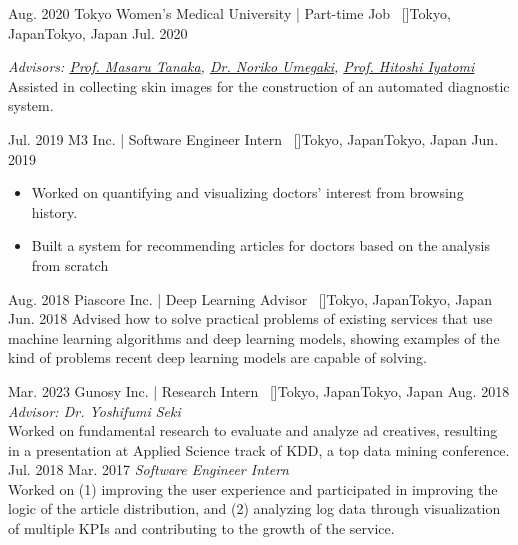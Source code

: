 \begin{experiences}
    \emptySeparator
    \researchexperience
    {Aug. 2020}   {Tokyo Women's Medical University | Part-time Job{\normalfont  ~ [\href{https://www.twmu.ac.jp/english/}{\small{\websiteSymbol}}]}}{Tokyo, Japan}{Tokyo, Japan}
    {Jul. 2020} {
    \textit{Advisors: \href{https://www.researchgate.net/scientific-contributions/Masaru-Tanaka-2078765174}{Prof. Masaru Tanaka}, \href{https://researchmap.jp/7000025183?lang=en}{Dr. Noriko Umegaki}, \href{https://scholar.google.com/citations?user=ghyQxvIAAAAJ}{Prof. Hitoshi Iyatomi}}\\
    Assisted in collecting skin images for the construction of an automated diagnostic system.

    }

    \emptySeparator
    \researchexperience
    {Jul. 2019}   {M3 Inc. | Software Engineer Intern{\normalfont  ~ [\href{https://corporate.m3.com/en/}{\small{\websiteSymbol}}]}}{Tokyo, Japan}{Tokyo, Japan}
    {Jun. 2019} {
    \begin{itemize}
        \item Worked on quantifying and visualizing doctors' interest from browsing history.
        \item Built a system for recommending articles for doctors based on the analysis from scratch
    \end{itemize}
    }

    \emptySeparator
    \researchexperience
    {Aug. 2018}   {Piascore Inc. | Deep Learning Advisor{\normalfont  ~ [\href{http://piascore.com/en/}{\small{\websiteSymbol}}]}}{Tokyo, Japan}{Tokyo, Japan}
    {Jun. 2018} {
    Advised how to solve practical problems of existing services that use machine learning algorithms and deep learning models, showing examples of the kind of problems recent deep learning models are capable of solving.
    }

    \emptySeparator
    \researchexperience
    {Mar. 2023}   {Gunosy Inc. | Research Intern{\normalfont  ~ [\href{https://gunosy.co.jp/en/}{\small{\websiteSymbol}}]}}{Tokyo, Japan}{Tokyo, Japan}
    {Aug. 2018} {\textit{Advisor: Dr. Yoshifumi Seki}\\
    Worked on fundamental research to evaluate and analyze ad creatives, resulting in a presentation at Applied Science track of KDD, a top data mining conference.
    \vskip 0.1cm
    }
    \researchexperience
    {Jul. 2018}   {}{}{}
    {Mar. 2017} {\textit{Software Engineer Intern}\\
        Worked on (1) improving the user experience and participated in improving the logic of the article distribution, and (2) analyzing log data through visualization of multiple KPIs and contributing to the growth of the service.
    }


\end{experiences}
